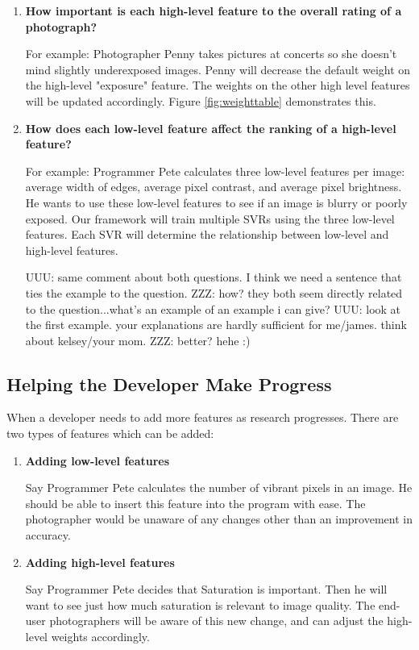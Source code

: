 \documentclass[11pt,letter]{article}
\begin{document}
\begin{enumerate}
\item \textbf{How important is each high-level feature to the overall rating of a photograph?}


For example: Photographer Penny takes pictures at concerts so she doesn't mind slightly underexposed images. Penny will decrease the default weight on the high-level "exposure" feature. The weights on the other high level features will be updated accordingly. Figure \ref{fig:weighttable} demonstrates this.

\item \textbf{How does each low-level feature affect the ranking of a high-level feature?}


For example: Programmer Pete calculates three low-level features per image: average width of edges, average pixel contrast, and average pixel brightness. He wants to use these low-level features to see if an image is blurry or poorly exposed. Our framework will train multiple SVRs using the three low-level features. Each SVR will determine the relationship between low-level and high-level features.

UUU: same comment about both questions. I think we need a sentence that ties the example to the question.
ZZZ: how? they both seem directly related to the question...what's an example of an example i can give? 
UUU: look at the first example. your explanations are hardly sufficient for me/james.
think about kelsey/your mom.
ZZZ: better? hehe :)

\end{enumerate}

\subsection{Helping the Developer Make Progress}
\label{easeofprogramming}
When a developer needs to add more features as research progresses. There are two types of features which can be added:
\begin{enumerate}
\item \textbf{Adding low-level features}

Say Programmer Pete calculates the number of vibrant pixels in an image. He should be able to insert this feature into the program with ease. The photographer would be unaware of any changes other than an improvement in accuracy.

\item \textbf{Adding high-level features}

Say Programmer Pete decides that Saturation is important. Then he will want to see just how much saturation is relevant to image quality. The end-user photographers will be aware of this new change, and can adjust the high-level weights accordingly.
\end{enumerate}
\end{document}
